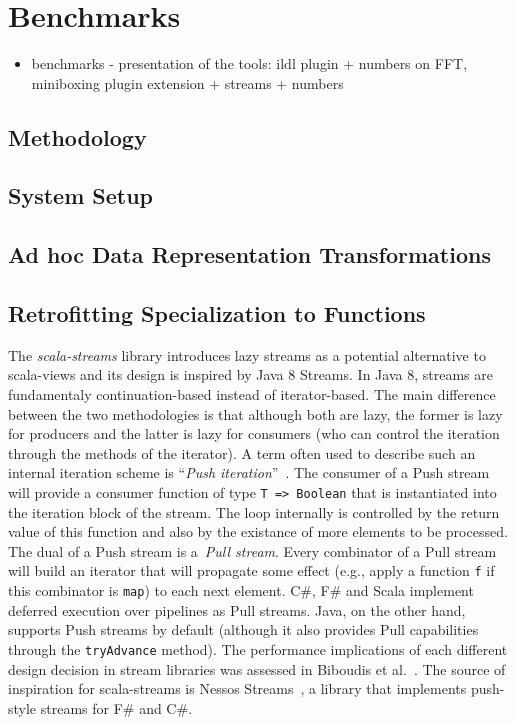 \section{Benchmarks}
\label{sec:benchmarks}
\begin{itemize}
  \item benchmarks - presentation of the tools: ildl plugin + numbers on FFT, miniboxing plugin extension + streams + numbers
\end{itemize}

\subsection{Methodology}

\subsection{System Setup}

\subsection{Ad hoc Data Representation Transformations}
\label{sec:benchmarks:ad-hoc}

\subsection{Retrofitting Specialization to Functions}
\label{sec:benchmarks:funcs}

The \emph{scala-streams} library introduces lazy streams as a potential
alternative to scala-views and its design is inspired by Java 8 Streams. In Java
8, streams are fundamentaly continuation-based instead of iterator-based. The
main difference between the two methodologies is that although both are lazy,
the former is lazy for producers and the latter is lazy for consumers (who can
control the iteration through the methods of the iterator). A term often used to
describe such an internal iteration scheme is ``\emph{Push
  iteration}''~\cite{obsidian,defuncpush}.  The consumer of a Push stream will
provide a consumer function of type \verb|T => Boolean| that is instantiated
into the iteration block of the stream. The loop internally is controlled by the
return value of this function and also by the existance of more elements to be
processed. The dual of a Push stream is a~\emph{Pull stream}. Every combinator
of a Pull stream will build an iterator that will propagate some effect (e.g.,
apply a function \verb|f| if this combinator is \verb|map|) to each next
element. C\#, F\# and Scala implement deferred execution over pipelines as Pull
streams. Java, on the other hand, supports Push streams by default (although it
also provides Pull capabilities through the \verb|tryAdvance| method). The
performance implications of each different design decision in stream libraries
was assessed in Biboudis et al.~\cite{biboudis_clash_2014}. The source of
inspiration for scala-streams is Nessos Streams~\cite{nessos_streams}, a library
that implements push-style streams for F\# and C\#.

